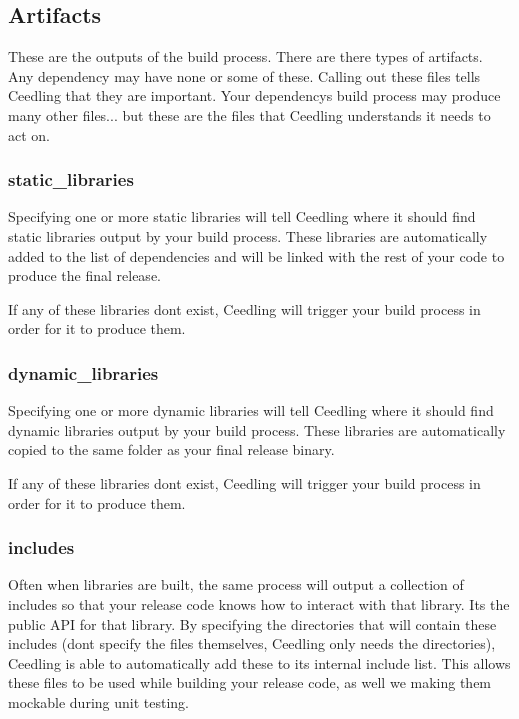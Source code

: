 \subsection*{Artifacts }

These are the outputs of the build process. There are there types of artifacts. Any dependency may have none or some of these. Calling out these files tells Ceedling that they are important. Your dependency\textquotesingle{}s build process may produce many other files... but these are the files that Ceedling understands it needs to act on.

\subsubsection*{{\ttfamily static\+\_\+libraries}}

Specifying one or more static libraries will tell Ceedling where it should find static libraries output by your build process. These libraries are automatically added to the list of dependencies and will be linked with the rest of your code to produce the final release.

If any of these libraries don\textquotesingle{}t exist, Ceedling will trigger your build process in order for it to produce them.

\subsubsection*{{\ttfamily dynamic\+\_\+libraries}}

Specifying one or more dynamic libraries will tell Ceedling where it should find dynamic libraries output by your build process. These libraries are automatically copied to the same folder as your final release binary.

If any of these libraries don\textquotesingle{}t exist, Ceedling will trigger your build process in order for it to produce them.

\subsubsection*{{\ttfamily includes}}

Often when libraries are built, the same process will output a collection of includes so that your release code knows how to interact with that library. It\textquotesingle{}s the public A\+PI for that library. By specifying the directories that will contain these includes (don\textquotesingle{}t specify the files themselves, Ceedling only needs the directories), Ceedling is able to automatically add these to its internal include list. This allows these files to be used while building your release code, as well we making them mockable during unit testing.

